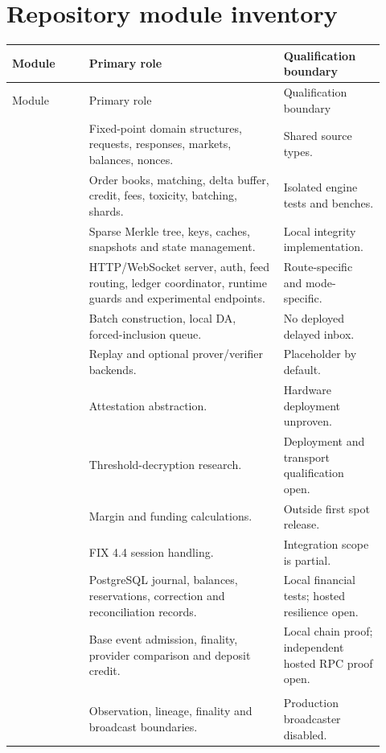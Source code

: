 \documentclass[envcountsame,runningheads,notitlepage]{llncs}
\newcommand{\pathref}[1]{\texttt{\detokenize{#1}}}
\begin{document}
\section{Repository module inventory}\label{app:inventory}
\small
\begin{longtable}{p{0.19\linewidth}p{0.48\linewidth}p{0.25\linewidth}}
\toprule
Module & Primary role & Qualification boundary \\
\midrule\endfirsthead
\toprule Module & Primary role & Qualification boundary \\
\midrule\endhead
\pathref{types} & Fixed-point domain structures, requests, responses, markets, balances, nonces. & Shared source types. \\
\pathref{engine} & Order books, matching, delta buffer, credit, fees, toxicity, batching, shards. & Isolated engine tests and benches. \\
\pathref{state} & Sparse Merkle tree, keys, caches, snapshots and state management. & Local integrity implementation. \\
\pathref{api} & HTTP/WebSocket server, auth, feed routing, ledger coordinator, runtime guards and experimental endpoints. & Route-specific and mode-specific. \\
\pathref{committer} & Batch construction, local DA, forced-inclusion queue. & No deployed delayed inbox. \\
\pathref{zkvm} & Replay and optional prover/verifier backends. & Placeholder by default. \\
\pathref{tee} & Attestation abstraction. & Hardware deployment unproven. \\
\pathref{committee} & Threshold-decryption research. & Deployment and transport qualification open. \\
\pathref{perp} & Margin and funding calculations. & Outside first spot release. \\
\pathref{fix} & FIX 4.4 session handling. & Integration scope is partial. \\
\pathref{ledger} & PostgreSQL journal, balances, reservations, correction and reconciliation records. & Local financial tests; hosted resilience open. \\
\pathref{indexer} & Base event admission, finality, provider comparison and deposit credit. & Local chain proof; independent hosted RPC proof open. \\
\shortstack[l]{\pathref{withdrawal-}\\\pathref{worker}} & Observation, lineage, finality and broadcast boundaries. & Production broadcaster disabled. \\

\end{longtable}
\end{document}
